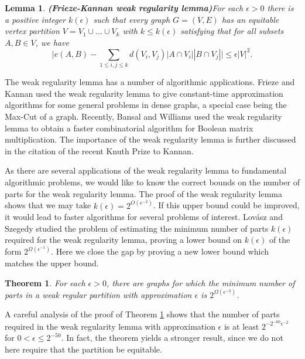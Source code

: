 \documentclass[11pt]{article}
\newtheorem{theorem}{Theorem}[section]
\newtheorem{lemma}{Lemma}[section]
\begin{document}
\begin{lemma}{\bf (Frieze-Kannan weak regularity lemma)}\label{FKWRL}
For each $\epsilon>0$ there is a positive integer $k(\epsilon)$ such that every
graph $G=(V,E)$ has an equitable vertex partition $V=V_1 \cup \ldots \cup V_k$ with $k
\leq k(\epsilon)$ satisfying that for all subsets $A,B \in V$, we have $$\big
|e(A,B)-\sum_{1 \leq i, j \leq k}
d(V_i,V_j)|A \cap V_i||B \cap V_j|\big | \leq \epsilon |V|^2.$$
\end{lemma}

The weak regularity lemma has a number of algorithmic applications. Frieze and
Kannan \cite{FrKa1} used the weak regularity lemma to give constant-time
approximation algorithms for some general problems in dense graphs, a special
case being the Max-Cut of a graph. Recently, Bansal and Williams \cite{BaWi}
used the weak regularity lemma to obtain a faster combinatorial algorithm for
Boolean matrix multiplication. The importance of the weak regularity lemma is
further discussed in the citation of the recent Knuth Prize to Kannan.

As there are several applications of the weak regularity lemma to fundamental
algorithmic problems, we would like to know the correct bounds on the number of
parts for the weak regularity lemma. The proof of the weak regularity lemma
\cite{FrKa1} shows that we may take $k(\epsilon)=2^{O(\epsilon^{-2})}$. If this
upper bound could be improved, it would lead to faster
algorithms for several problems of interest. Lov\'asz and Szegedy
\cite{LS} studied the problem of estimating the minimum number of parts
$k(\epsilon)$ required for the weak regularity lemma, proving a lower bound on
$k(\epsilon)$ of the form $2^{\Omega(\epsilon^{-1})}$. Here we close the gap by
proving a new lower bound which matches the upper bound.

\begin{theorem}\label{lbweakmain}
For each $\epsilon>0$, there are graphs for which the minimum number of parts
in a weak regular partition with approximation $\epsilon$ is
$2^{\Omega(\epsilon^{-2})}$.
\end{theorem}

A careful analysis of the proof of Theorem \ref{lbweakmain} shows that the
number of parts required in the weak regularity lemma with approximation
$\epsilon$ is at least $2^{-2^{-60}\epsilon^{-2}}$ for $0<\epsilon \leq 2^{-50}$. In fact, the theorem yields a stronger result, since we do not here require that the partition be equitable.
\end{document}
